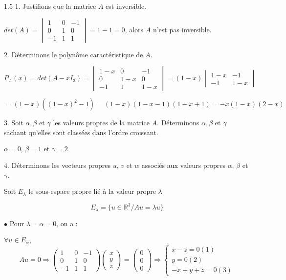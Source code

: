 \documentclass[12pt]{article}
\begin{document}
\begin{spacing}{1.5}
1. Justifions que la matrice $A$ est inversible.

$det(A)=\begin{vmatrix}
1 & 0 & -1\\
0 & 1 & 0\\
-1 & 1 & 1
\end{vmatrix}=1-1=0$, alors $A$ n'est pas inversible.

2. Déterminons le polynôme caractéristique de $A$.

$P_A(x)=det(A-xI_3)=\begin{vmatrix}
1-x & 0 & -1\\
0 & 1-x & 0\\
-1 & 1 & 1-x
\end{vmatrix}=(1-x)\begin{vmatrix}
1-x & -1 \\ 
-1 & 1-x
\end{vmatrix}$

$=(1-x)((1-x)^2-1)=(1-x)(1-x-1)(1-x+1)=-x(1-x)(2-x)$ 

3. Soit $\alpha, \beta$ et $\gamma$ les valeurs propres de la matrice $A$. Déterminons $\alpha, \beta$ et $\gamma$ sachant qu'elles sont classées dans l'ordre croissant.

$\alpha=0$, $\beta=1$ et $\gamma=2$


4. Déterminons les vecteurs propres $u$, $v$ et $w$ associés aux valeurs propres $\alpha$, $\beta$ et $\gamma$.

Soit $E_\lambda$ le sous-espace propre lié à la valeur propre $\lambda$

\[
E_\lambda=\{u\in \mathbb{R}^3/Au=\lambda u\}
\]

\medskip
$\bullet$ Pour $\lambda=\alpha=0$, on a :

$\forall u\in E_\alpha$, \[Au=0\Rightarrow \begin{pmatrix}
1 & 0 & -1\\
0 & 1 & 0\\
-1 & 1 & 1
\end{pmatrix}\begin{pmatrix}
x\\
y\\
z
\end{pmatrix}=\begin{pmatrix}
0\\
0\\
0
\end{pmatrix}\Rightarrow \begin{cases}
x-z=0(1)\\
y=0(2)\\
-x+y+z=0(3)
\end{cases}\]


\end{spacing}
\end{document}
